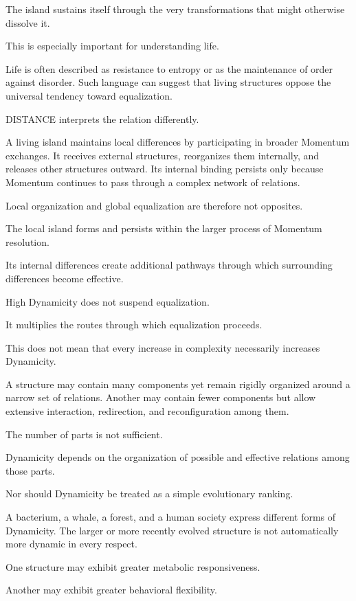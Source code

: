 The island sustains itself through the very transformations that might otherwise dissolve it.

This is especially important for understanding life.

Life is often described as resistance to entropy or as the maintenance of order against disorder. Such language can suggest that living structures oppose the universal tendency toward equalization.

DISTANCE interprets the relation differently.

A living island maintains local differences by participating in broader Momentum exchanges. It receives external structures, reorganizes them internally, and releases other structures outward. Its internal binding persists only because Momentum continues to pass through a complex network of relations.

Local organization and global equalization are therefore not opposites.

The local island forms and persists within the larger process of Momentum resolution.

Its internal differences create additional pathways through which surrounding differences become effective.

High Dynamicity does not suspend equalization.

It multiplies the routes through which equalization proceeds.

This does not mean that every increase in complexity necessarily increases Dynamicity.

A structure may contain many components yet remain rigidly organized around a narrow set of relations. Another may contain fewer components but allow extensive interaction, redirection, and reconfiguration among them.

The number of parts is not sufficient.

Dynamicity depends on the organization of possible and effective relations among those parts.

Nor should Dynamicity be treated as a simple evolutionary ranking.

A bacterium, a whale, a forest, and a human society express different forms of Dynamicity. The larger or more recently evolved structure is not automatically more dynamic in every respect.

One structure may exhibit greater metabolic responsiveness.

Another may exhibit greater behavioral flexibility.

